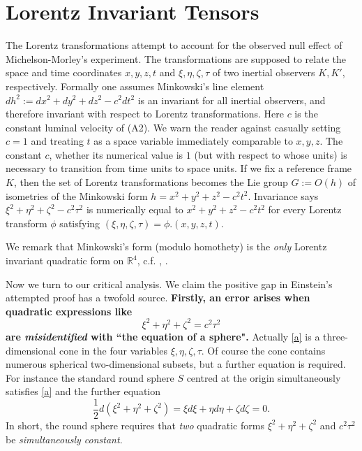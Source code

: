 \documentclass[12pt]{amsart}
\theoremstyle{definition}
\theoremstyle{remark}
\newcommand{\bR}{\mathbb{R}}
\begin{document}
\section{Lorentz Invariant Tensors}\label{li}

The Lorentz transformations attempt to account for the observed null effect of Michelson-Morley's experiment. The transformations are supposed to relate the space and time coordinates $x,y,z,t$ and $\xi, \eta, \zeta, \tau$ of two inertial observers $K, K'$, respectively. Formally one assumes Minkowski's line element $dh^2:=dx^2+dy^2+dz^2-c^2dt^2$ is an invariant for all inertial observers, and therefore invariant with respect to Lorentz transformations. Here $c$ is the constant luminal velocity of (A2). We warn the reader against casually setting $c=1$ and treating $t$ as a space variable immediately comparable to $x,y,z$. The constant $c$, whether its numerical value is $1$ (but with respect to whose units) is necessary to transition from time units to space units. If we fix a reference frame $K$, then the set of Lorentz transformations becomes the Lie group $G:=O(h)$ of isometries of the Minkowski form $h=x^2+y^2+z^2-c^2t^2$. Invariance says $\xi^2+\eta^2+\zeta^2-c^2 \tau^2$ is numerically equal to $x^2+y^2+z^2-c^2 t^2$ for every Lorentz transform $\phi$ satisfying $(\xi, \eta, \zeta, \tau)=\phi.(x,y,z,t)$. 

We remark that Minkowski's form (modulo homothety) is the \emph{only} Lorentz invariant quadratic form on $\bR^4$, c.f. \cite{elton2010indefinite}, \cite{arminjon2018lorentz}.








Now we turn to our critical analysis. We claim the positive gap in Einstein's attempted proof has a twofold source. \textbf{Firstly, an error arises when quadratic expressions like \begin{equation}\label{a}\xi^2+\eta^2+\zeta^2=c^2 \tau^2
\end{equation} are \emph{misidentified} with ``the equation of a sphere".} Actually \eqref{a} is a three-dimensional cone in the four variables $\xi, \eta, \zeta, \tau$. Of course the cone contains numerous spherical two-dimensional subsets, but a further equation is required. For instance the standard round sphere $S$ centred at the origin simultaneously satisfies \eqref{a} and the further equation $$\frac{1}{2}d(\xi^2+\eta^2+\zeta^2)=\xi d\xi+\eta d\eta +\zeta d\zeta=0.$$ In short, the round sphere requires that \emph{two} quadratic forms $\xi^2+\eta^2+\zeta^2$ and $c^2\tau^2$ be \emph{simultaneously constant}. 
\end{document}
